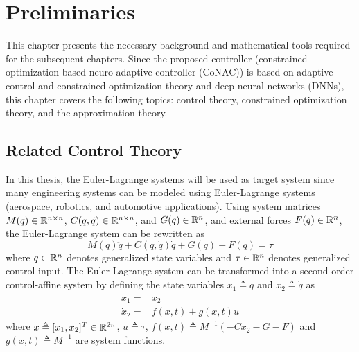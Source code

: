 
\chapter{Preliminaries} \label{chapter2}

This chapter presents the necessary background and mathematical tools required for the subsequent chapters.
Since the proposed controller (constrained optimization-based neuro-adaptive controller (CoNAC)) is based on adaptive control and constrained optimization theory and deep neural networks (DNNs), this chapter covers the following topics: control theory, constrained optimization theory, and the approximation theory.

\section{Related Control Theory} \label{chap2:sec:ctrl}


In this thesis, the Euler-Lagrange systems will be used as target system since many engineering systems can be modeled using Euler-Lagrange systems (\eg aerospace, robotics, and automotive applications).
Using system matrices $M(q)\in\mathbb{R}^{n\times n}$, $C(q,\dot{q})\in\mathbb{R}^{n\times n}$, and $G(q)\in\mathbb{R}^{n}$, and external forces $F(q)\in\mathbb{R}^n$, the Euler-Lagrange system can be rewritten as
\begin{equation}
    M(q)\ddot{q} + C(q,\dot{q})\dot{q} + G(q) +F(q)= \tau
    \label{chap2:eq:EL}
\end{equation}
where $q\in\mathbb{R}^n$ denotes generalized state variables and $\tau\in\mathbb{R}^n$ denotes generalized control input.
The Euler-Lagrange system can be transformed into a second-order control-affine system by defining the state variables $x_1\triangleq q$ and $x_2\triangleq \dot q$ as
\begin{equation}
  \begin{aligned}
    \dot x_1 =& x_2\\
    \dot x_2 =& f(x,t)+g(x,t)u
  \end{aligned}
\end{equation}
where $x\triangleq [x_1,x_2]^T\in\mathbb{R}^{2n}$, $u\triangleq \tau$, $f(x,t)\triangleq M^{-1}(-Cx_2-G-F)$ and $g(x,t)\triangleq M^{-1}$ are system functions.

